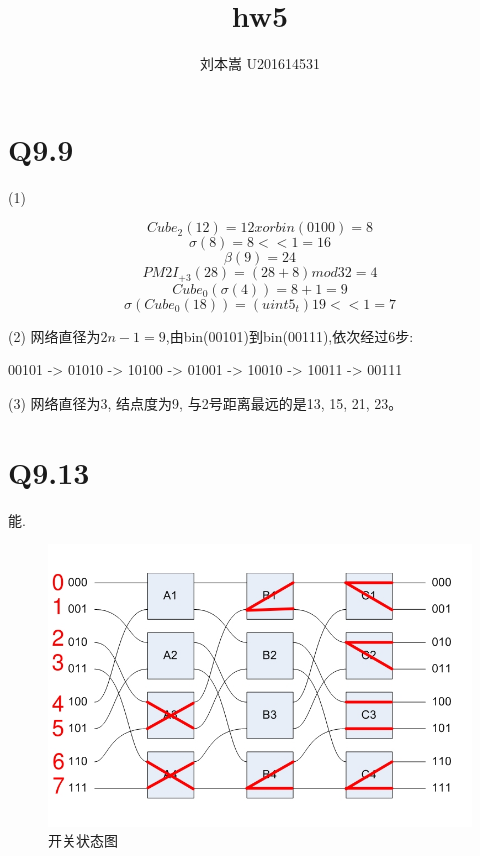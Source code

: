 \documentclass{article}
\begin{document}
\begin{CJK}{UTF8}{gbsn}

\title{hw5}
\author{刘本嵩 U201614531}

\maketitle


\section{Q9.9}
\Large
\smallskip

(1)

    $$Cube_2(12) = 12 xor bin(0100) = 8$$
    $$\sigma(8) = 8<<1 = 16$$
    $$\beta(9) = 24$$
    $$PM2I_{+3}(28) = (28+8) mod 32 = 4$$
    $$Cube_0(\sigma(4)) = 8+1 = 9$$
    $$\sigma(Cube_0(18)) = (uint5_t)19<<1 = 7$$

(2) 网络直径为$2n-1=9$,由bin(00101)到bin(00111),依次经过6步:

    00101 -> 01010 -> 10100 -> 01001 -> 10010 -> 10011 -> 00111

(3) 网络直径为3, 结点度为9, 与2号距离最远的是13, 15, 21, 23。

\section{Q9.13}
\Large
\smallskip

能.

\begin{figure}[H]
\centering
\includegraphics[scale=0.5]{hw5-img1.jpg}
\caption{开关状态图} 
\end{figure}


\end{CJK}
\end{document}
